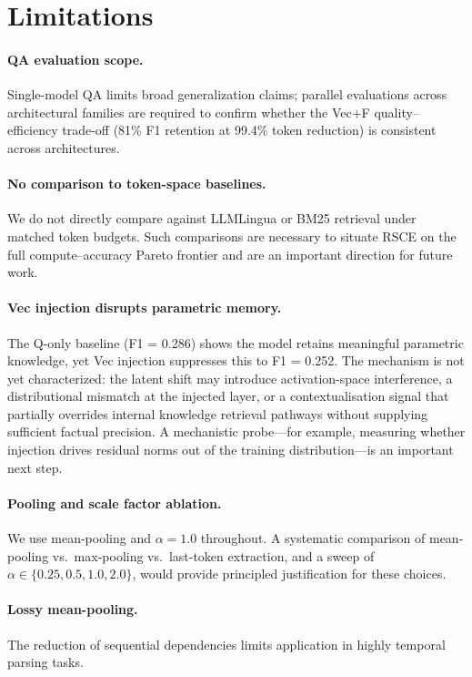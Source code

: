 \documentclass[11pt]{article}
\begin{document}
\section*{Limitations}

\paragraph{QA evaluation scope.} Single-model QA limits broad generalization claims; parallel evaluations across architectural families are required to confirm whether the Vec+F quality--efficiency trade-off (81\% F1 retention at 99.4\% token reduction) is consistent across architectures.

\paragraph{No comparison to token-space baselines.} We do not directly compare against LLMLingua or BM25 retrieval under matched token budgets. Such comparisons are necessary to situate RSCE on the full compute--accuracy Pareto frontier and are an important direction for future work.

\paragraph{Vec injection disrupts parametric memory.} The Q-only baseline (F1 = 0.286) shows the model retains meaningful parametric knowledge, yet Vec injection suppresses this to F1 = 0.252. The mechanism is not yet characterized: the latent shift may introduce activation-space interference, a distributional mismatch at the injected layer, or a contextualisation signal that partially overrides internal knowledge retrieval pathways without supplying sufficient factual precision. A mechanistic probe---for example, measuring whether injection drives residual norms out of the training distribution---is an important next step.

\paragraph{Pooling and scale factor ablation.} We use mean-pooling and $\alpha = 1.0$ throughout. A systematic comparison of mean-pooling vs.\ max-pooling vs.\ last-token extraction, and a sweep of $\alpha \in \{0.25, 0.5, 1.0, 2.0\}$, would provide principled justification for these choices.

\paragraph{Lossy mean-pooling.} The reduction of sequential dependencies limits application in highly temporal parsing tasks.
\end{document}
